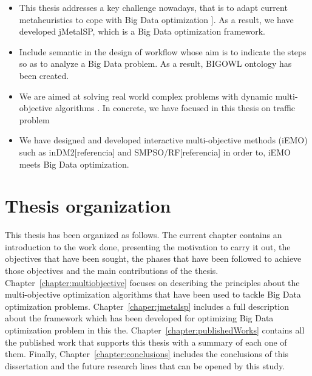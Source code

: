 \begin{itemize}
	\item This thesis addresses a key challenge nowadays, that is to adapt current metaheuristics to cope with Big Data optimization \cite{BD-challenges-2014}]. As a result, we have developed jMetalSP, which is a Big Data optimization framework. 
    \item Include semantic in the design of workflow whose aim is to indicate the steps so as to analyze a Big Data problem. As a result, BIGOWL ontology has been created. 
    \item We are aimed at solving real world complex problems with dynamic multi-objective  algorithms . In concrete, we have focused in this thesis on traffic problem
    \item We have designed and developed interactive multi-objective methods (iEMO) such as inDM2[referencia] and SMPSO/RF[referencia] in order to, iEMO meets Big Data optimization. 

\end{itemize}


\section{Thesis organization}

This thesis has been organized as follows.
The current chapter contains an introduction to the work done, presenting the motivation to carry it out, the objectives that have been sought, the phases that have been followed to achieve those objectives and the main contributions of the thesis.
Chapter~\ref{chapter:multiobjective} focuses on describing the principles about the multi-objective optimization algorithms that have been used to tackle Big Data optimization problems. 
Chapter~\ref{chaper:jmetalsp} includes a full description about the framework which has been developed for optimizing Big Data optimization problem in this the. 
Chapter~\ref{chapter:publishedWorks} contains all the published work that supports this thesis with a summary of each one of them.
Finally, Chapter~\ref{chapter:conclusions} includes the conclusions of this dissertation and the future research lines that can be opened by this study.






















